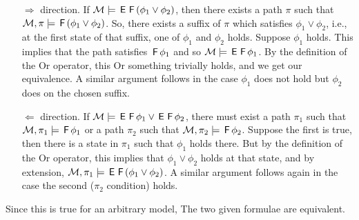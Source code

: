 \begin{alphaparts}
    \begin{itemize}
        \item[$\Rightarrow$ direction.] 
            If $\mathcal{M} \models \,\textsf{E}\,\,\textsf{F}\, (\phi_1 \lor \phi_2)$, then
            there exists a path $\pi$ such that $\mathcal{M}, \pi \models
            \,\textsf{F}\,(\phi_1 \lor\phi_2)$. So, there exists a suffix of $\pi$
            which satisfies $\phi_1 \lor\phi_2$, i.e., at the first state of
            that suffix, one of $\phi_1$ and $\phi_2$ holds. Suppose $\phi_1$
            holds. This implies that the path satisfies $\,\textsf{F}\,\phi_1$ and so
            $\mathcal{M} \models \,\textsf{E}\,\,\textsf{F}\,\phi_1$. By the definition of the
            Or operator, this Or something trivially holds, and we get our
            equivalence. A similar argument follows in the case $\phi_1$ does
            not hold but $\phi_2$ does on the chosen suffix.
        \item[$\Leftarrow$ direction.] 
            If $\mathcal{M} \models \,\textsf{E}\,\,\textsf{F}\, \phi_1 \lor
            \,\textsf{E}\,\,\textsf{F}\, \phi_2$, there must exist a path $\pi_1$ such
            that $\mathcal{M}, \pi_1 \models \,\textsf{F}\,\phi_1$ or a path $\pi_2$ such
            that $\mathcal{M}, \pi_2 \models \,\textsf{F}\,\phi_2$. Suppose the first is
            true, then there is a state in $\pi_1$ such that $\phi_1$ holds
            there. But by the definition of the Or operator, this implies that
            $\phi_1 \lor \phi_2$ holds at that state, and by extension, $\mathcal{M},
            \pi_1 \models \,\textsf{E}\,\,\textsf{F}\, (\phi_1 \lor \phi_2)$. A similar
            argument follows again in the case the second ($\pi_2$ condition)
            holds.
    \end{itemize}

    Since this is true for an arbitrary model, The two given
    formulae are equivalent.
\end{alphaparts}